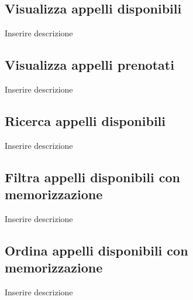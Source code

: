 
\begin{figure}
	\subsection{Visualizza appelli disponibili}
	\centering
	\caption{Inserire descrizione}
	\label{fig:prova}
\end{figure}


\begin{figure}
	\subsection{ Visualizza appelli prenotati }
	\centering
	\caption{Inserire descrizione}
	\label{fig:prova}
\end{figure}


\begin{figure}
	\subsection{Ricerca appelli disponibili}
	\centering
	\caption{Inserire descrizione}
	\label{fig:prova}
\end{figure}


\begin{figure}
	\subsection{Filtra appelli disponibili con memorizzazione}
	\centering
	\caption{Inserire descrizione}
	\label{fig:prova}
\end{figure}


\begin{figure}
	\subsection{Ordina appelli disponibili con memorizzazione}
	\centering
	\caption{Inserire descrizione}
	\label{fig:prova}
\end{figure}

